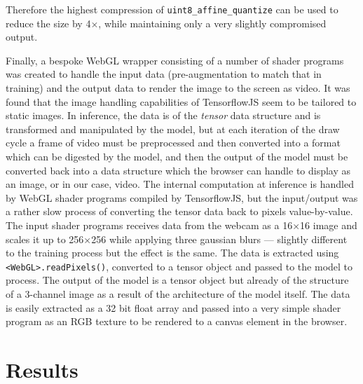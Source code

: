 \documentclass{article}
\begin{document}
Therefore the highest compression of \verb|uint8_affine_quantize| can be used to reduce the size by 4$\times$, while maintaining only a very slightly compromised output.

Finally, a bespoke WebGL wrapper consisting of a number of shader programs was created to handle the input data (pre-augmentation to match that in training) and the output data to render the image to the screen as video. It was found that the image handling capabilities of TensorflowJS seem to be tailored to static images. In inference, the data is of the \textit{tensor} data structure and is transformed and manipulated by the model, but at each iteration of the draw cycle a frame of video must be preprocessed and then converted into a format which can be digested by the model, and then the output of the model must be converted back into a data structure which the browser can handle to display as an image, or in our case, video. The internal computation at inference is handled by WebGL shader programs compiled by TensorflowJS, but the input/output was a rather slow process of converting the tensor data back to pixels value-by-value. The input shader programs receives data from the webcam as a 16$\times$16 image and scales it up to 256$\times$256 while applying three gaussian blurs --- slightly different to the training process but the effect is the same. The data is extracted using \verb|<WebGL>.readPixels()|, converted to a tensor object and passed to the model to process. The output of the model is a tensor object but already of the structure of a 3-channel image as a result of the architecture of the model itself. The data is easily extracted as a 32 bit float array and passed into a very simple shader program as an RGB texture to be rendered to a canvas element in the browser.

\section{Results}
\end{document}

